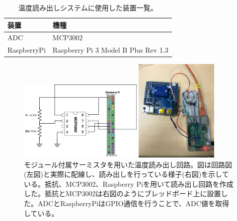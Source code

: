 \begin{table}[tbp]
\begin{center}
\caption[温度読み出しシステムに使用した装置一覧]{温度読み出しシステムに使用した装置一覧。}
\label{demo_temp_device}
  \small
  \begin{tabular}{|ll|} \hline
    装置 & 機種 \\ \hline
    ADC & MCP3002\cite{5-3} \\  
    RaspberryPi &  Raspberry Pi 3 Model B Plus Rev 1.3\cite{5-4} \\ \hline 
  \end{tabular}
\end{center}
\end{table}

\begin{figure}[h]\centering
  \begin{minipage}{0.5\hsize}
    \includegraphics[width=6cm]{./temp_circit.png}
  \end{minipage}
  \begin{minipage}{0.4\hsize}
    \includegraphics[width=4cm]{./temp_circit_pic.png}
  \end{minipage}
\caption[モジュール付属サーミスタを用いた温度読み出し回路]{モジュール付属サーミスタを用いた温度読み出し回路。図は回路図(左図)と実際に配線し、読み出しを行っている様子(右図)を示している。抵抗、MCP3002、Raspberry Piを用いて読み出し回路を作成した。抵抗とMCP3002は右図のようにブレッドボード上に設置した。ADCとRaspberryPiはGPIO通信\cite{5-9}を行うことで、ADC値を取得している。}
\label{demo_temp_circit_pic}
\end{figure}

